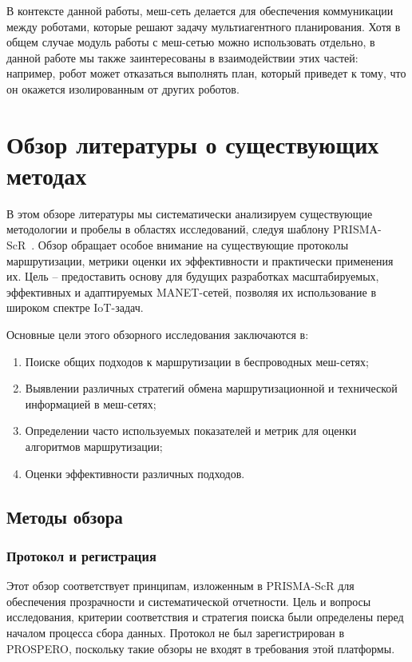 \documentclass[%
]{report}
\begin{document}
В контексте данной работы, меш-сеть делается для обеспечения коммуникации между роботами,
которые решают задачу мультиагентного планирования.
Хотя в общем случае модуль работы с меш-сетью можно использовать отдельно,
в данной работе мы также заинтересованы в взаимодействии этих частей:
например, робот может отказаться выполнять план,
который приведет к тому, что он окажется изолированным от других роботов.


\chapter{Обзор литературы о существующих методах}

В этом обзоре литературы мы
систематически анализируем существующие методологии
и пробелы в областях исследований,
следуя шаблону PRISMA-ScR~\cite{prisma-src}.
Обзор обращает особое внимание на
существующие протоколы маршрутизации,
метрики оценки их эффективности и практически применения их.
Цель -- предоставить основу для будущих разработках
масштабируемых, эффективных и адаптируемых
MANET-сетей,
позволяя их использование в широком спектре IoT-задач.

Основные цели этого обзорного исследования заключаются в:

\begin{enumerate}

\item Поиске общих подходов к маршрутизации в беспроводных меш-сетях;
\item Выявлении различных стратегий обмена маршрутизационной и технической информацией в меш-сетях;
\item Определении часто используемых показателей и метрик для оценки алгоритмов маршрутизации;
\item Оценки эффективности различных подходов.
\end{enumerate}

\section{Методы обзора}\label{methods}

\subsection{Протокол и регистрация}\label{protocol-and-registration}

Этот обзор соответствует принципам, изложенным в
PRISMA-ScR для обеспечения прозрачности и
систематической отчетности.
Цель и вопросы исследования, критерии соответствия
и стратегия поиска были определены перед началом процесса сбора данных.
Протокол не был зарегистрирован в PROSPERO,
поскольку такие обзоры не входят в требования этой платформы.
\end{document}
